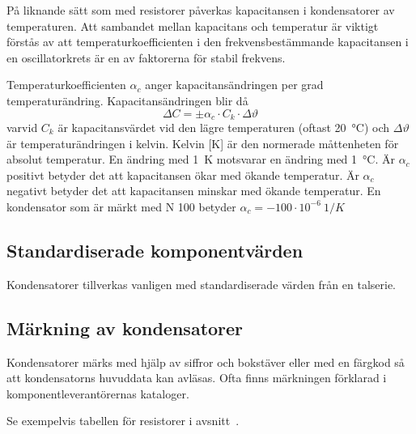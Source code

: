 På liknande sätt som med resistorer påverkas kapacitansen i kondensatorer av
temperaturen.
Att sambandet mellan kapacitans och temperatur är viktigt förstås av att
temperaturkoefficienten i den frekvensbestämmande kapacitansen i en
oscillatorkrets är en av faktorerna för stabil frekvens.

Temperaturkoefficienten \(\alpha _c\) anger kapacitansändringen per grad temperaturändring.
Kapacitansändringen blir då
\[\Delta C = \pm \alpha _c \cdot C_k \cdot \Delta\vartheta\]
varvid \(C_k\) är kapacitansvärdet vid den lägre temperaturen (oftast
\qty{20}{\degreeCelsius}) och \(\Delta\vartheta\) är temperaturändringen i
kelvin.
Kelvin [K] är den normerade måttenheten för absolut temperatur.
En ändring med \qty{1}{\kelvin} motsvarar en ändring med \qty{1}{\degreeCelsius}.
Är \(\alpha _c\) positivt betyder det att kapacitansen ökar med ökande
temperatur.
Är \(\alpha _c\) negativt betyder det att kapacitansen minskar med ökande
temperatur.
En kondensator som är märkt med N 100 betyder
\(\alpha _c = -100 \cdot 10^{-6}\ 1/K\)

\subsection{Standardiserade komponentvärden}

Kondensatorer tillverkas vanligen med standardiserade värden från en talserie.

\subsection{Märkning av kondensatorer}

Kondensatorer märks med hjälp av siffror och bokstäver eller med en färgkod så
att kondensatorns huvuddata kan avläsas.
Ofta finns märkningen förklarad i komponentleverantörernas kataloger.

Se exempelvis tabellen för resistorer i avsnitt~.
